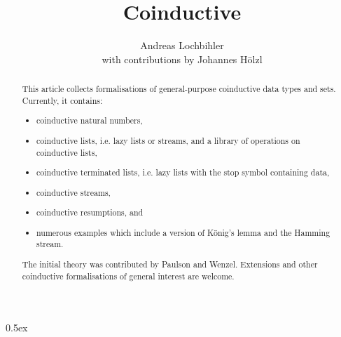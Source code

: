 \documentclass[11pt,a4paper]{article}
\begin{document}
\title{Coinductive}
\author{Andreas Lochbihler \\ with contributions by Johannes H\"olzl}
\maketitle

\begin{abstract}
This article collects formalisations of general-purpose coinductive data
types and sets. Currently, it contains:
\begin{itemize}
\item coinductive natural numbers,
\item coinductive lists, i.e. lazy lists or streams, and a library of operations on coinductive lists,
\item coinductive terminated lists, i.e. lazy lists with the stop symbol containing data,
\item coinductive streams,
\item coinductive resumptions, and
\item numerous examples which include a version of K\"onig's lemma and the Hamming stream.
\end{itemize}

The initial theory was contributed by Paulson and Wenzel.  Extensions
and other coinductive formalisations of general interest are welcome.
\end{abstract}

\tableofcontents

\parindent 0pt\parskip 0.5ex

\pagebreak



%
%
\end{document}
